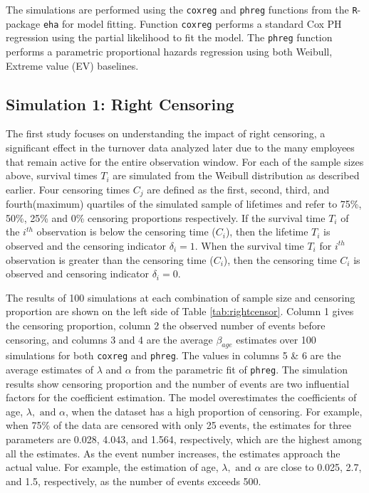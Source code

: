 \documentclass[12pt,letterpaper]{article}
\begin{document}
The simulations are performed using the {\tt coxreg} and {\tt phreg} functions from the {\tt R}-package {\tt eha} \citep{eha} for model fitting.  Function {\tt coxreg} performs a standard Cox PH regression using the partial likelihood to fit the model.  The {\tt phreg} function performs a parametric proportional hazards regression using both Weibull, Extreme value (EV) baselines.



\subsection{Simulation 1: Right Censoring} \label{rightcensor.sim1}

The first study focuses on understanding the impact of right censoring, a significant effect in the turnover data analyzed later due to the many employees that remain active for the entire observation window. For each of the sample sizes above, survival times $T_i$ are simulated from the Weibull distribution as described earlier.  Four censoring times $C_j$ are defined as the first, second, third, and fourth(maximum) quartiles of the simulated sample of lifetimes and refer to 75\%, 50\%, 25\% and 0\% censoring proportions respectively. If the survival time $T_i$ of the $i^{th}$ observation is below the censoring time ($C_i$), then the lifetime $T_i$ is observed and the censoring indicator $\delta_i=1$. When the survival time $T_i$ for $i^{th}$ observation is greater than the censoring time ($C_i$), then the censoring time $C_i$ is observed and censoring indicator $\delta_i = 0$.

The results of 100 simulations at each combination of sample size and censoring proportion are shown on the left side of Table \ref{tab:rightcensor}. Column 1 gives the censoring proportion, column 2 the observed number of events before censoring, and columns 3 and 4 are the average $\beta_{age}$ estimates over 100 simulations for both {\tt coxreg} and {\tt phreg}.  The values in columns 5 \& 6  are the average estimates of $\lambda$ and $\alpha$ from the parametric fit of {\tt phreg}. The simulation results show censoring proportion and the number of events are two influential factors for the coefficient estimation. The model overestimates the coefficients of age, $\lambda, \text{ and } \alpha$, when the dataset has a high proportion of censoring. For example, when 75\% of the data are censored with only 25 events, the estimates for three parameters are 0.028, 4.043, and 1.564, respectively, which are the highest among all the estimates. As the event number increases, the estimates approach the actual value. For example, the estimation of age, $\lambda, \text{ and } \alpha$ are close to 0.025, 2.7, and 1.5, respectively, as the number of events exceeds 500.
\end{document}
